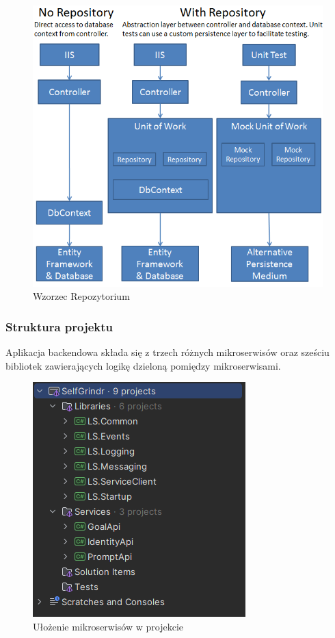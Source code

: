 \begin{figure}[H]
    \centering
    \includegraphics[width=1\linewidth]{Obrazy/repository.png}
    \caption{Wzorzec Repozytorium}
    \label{fig:enter-label}
\end{figure}

\subsubsection{Struktura projektu}
Aplikacja backendowa składa się z trzech różnych mikroserwisów oraz sześciu bibliotek zawierających logikę dzieloną pomiędzy mikroserwisami. 

\begin{figure}
    \centering
    \includegraphics[width=0.5\linewidth]{Obrazy/BackendStruktura.png}
    \caption{Ułożenie mikroserwisów w projekcie}
    \label{fig:enter-label}
\end{figure}

